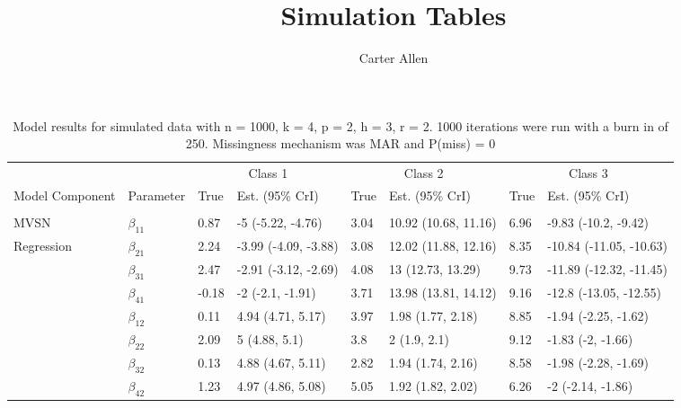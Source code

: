 \documentclass[]{article}
\title{Simulation Tables}
\author{Carter Allen}
\date{}
\begin{document}
\maketitle

\begin{table}[t]

\caption{\label{tab:unnamed-chunk-5}Model results for simulated data with n = 1000, k = 4, p = 2, h = 3, r = 2. 1000 iterations were run with a burn in of 250. Missingness mechanism was MAR and P(miss) = 0}
\centering
\fontsize{8}{10}\selectfont
\begin{tabular}{llllllll}
\toprule
\multicolumn{2}{c}{ } & \multicolumn{2}{c}{Class 1} & \multicolumn{2}{c}{Class 2} & \multicolumn{2}{c}{Class 3} \\
\cmidrule(l{3pt}r{3pt}){3-4} \cmidrule(l{3pt}r{3pt}){5-6} \cmidrule(l{3pt}r{3pt}){7-8}
Model Component & Parameter & True & Est. (95\% CrI) & True & Est. (95\% CrI) & True & Est. (95\% CrI)\\
\midrule
\addlinespace[0.3em]
\multicolumn{8}{l}{\textbf{ }}\\
\hspace{1em}MVSN & $\beta_{11}$ & 0.87 & -5 (-5.22, -4.76) & 3.04 & 10.92 (10.68, 11.16) & 6.96 & -9.83 (-10.2, -9.42)\\
\hspace{1em}Regression & $\beta_{21}$ & 2.24 & -3.99 (-4.09, -3.88) & 3.08 & 12.02 (11.88, 12.16) & 8.35 & -10.84 (-11.05, -10.63)\\
\hspace{1em} & $\beta_{31}$ & 2.47 & -2.91 (-3.12, -2.69) & 4.08 & 13 (12.73, 13.29) & 9.73 & -11.89 (-12.32, -11.45)\\
\hspace{1em} & $\beta_{41}$ & -0.18 & -2 (-2.1, -1.91) & 3.71 & 13.98 (13.81, 14.12) & 9.16 & -12.8 (-13.05, -12.55)\\
\hspace{1em} & $\beta_{12}$ & 0.11 & 4.94 (4.71, 5.17) & 3.97 & 1.98 (1.77, 2.18) & 8.85 & -1.94 (-2.25, -1.62)\\
\hspace{1em} & $\beta_{22}$ & 2.09 & 5 (4.88, 5.1) & 3.8 & 2 (1.9, 2.1) & 9.12 & -1.83 (-2, -1.66)\\
\hspace{1em} & $\beta_{32}$ & 0.13 & 4.88 (4.67, 5.11) & 2.82 & 1.94 (1.74, 2.16) & 8.58 & -1.98 (-2.28, -1.69)\\
\hspace{1em} & $\beta_{42}$ & 1.23 & 4.97 (4.86, 5.08) & 5.05 & 1.92 (1.82, 2.02) & 6.26 & -2 (-2.14, -1.86)\\

\end{tabular}
\end{table}
\end{document}
